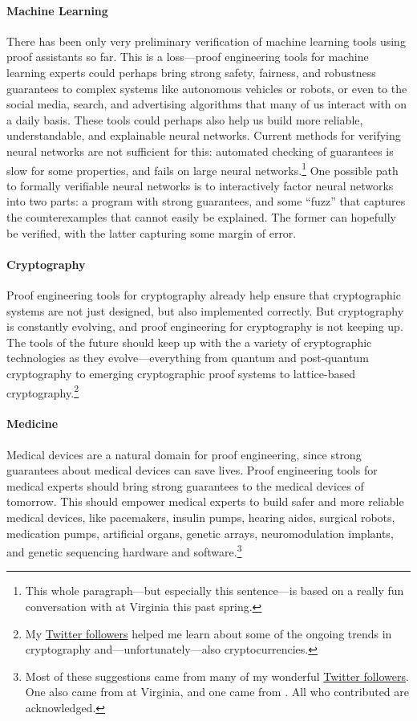 \paragraph{Machine Learning}
There has been only very preliminary verification of machine learning tools using proof assistants so far.
This is a loss---proof engineering tools for machine learning experts could perhaps bring strong safety, fairness, and robustness guarantees to
complex systems like autonomous vehicles or robots, or even to the social media, search, and advertising algorithms that many of us interact with
on a daily basis. These tools could perhaps also help us build more reliable, understandable, and explainable neural networks.
Current methods for verifying neural networks are not sufficient for this: 
automated checking of guarantees is slow for some properties, and fails on large 
neural networks.\footnote{This whole paragraph---but especially this sentence---is based on a really fun conversation with  at Virginia this past spring.}
One possible path to formally verifiable neural networks is to interactively factor neural networks into two parts: a program with strong guarantees,
and some ``fuzz'' that captures the counterexamples that cannot easily be explained.
The former can hopefully be verified, with the latter capturing some margin of error.

\paragraph{Cryptography}
Proof engineering tools for cryptography already help ensure that cryptographic systems are not just designed, but also implemented correctly.
But cryptography is constantly evolving, and proof engineering for cryptography is not keeping up.
The tools of the future should keep up with the a variety of cryptographic technologies as they evolve---everything from quantum and post-quantum cryptography
to emerging cryptographic proof systems to lattice-based cryptography.\footnote{My \href{https://twitter.com/TaliaRinger/status/1391943048465055750}{Twitter followers}
helped me learn about some of the ongoing trends in cryptography and---unfortunately---also cryptocurrencies.} 

\paragraph{Medicine} 
Medical devices are a natural domain for proof engineering, since strong guarantees about medical devices can save lives.
Proof engineering tools for medical experts should bring strong guarantees to the medical devices of tomorrow.
This should empower medical experts to build safer and more reliable medical devices,
like pacemakers, insulin pumps, hearing aides, surgical robots, medication pumps, artificial organs,
genetic arrays, neuromodulation implants, and genetic sequencing hardware and 
software.\footnote{Most of these suggestions came from many of my wonderful \href{https://twitter.com/TaliaRinger/status/1388282607926857731}{Twitter followers}.
One also came from  at Virginia, and one came from . All who contributed are acknowledged.}

